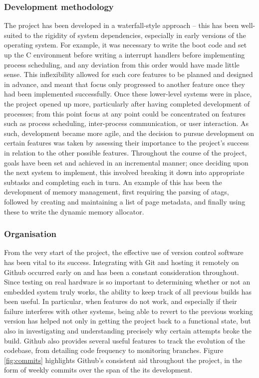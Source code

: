     \subsubsection{Development methodology}
        The project has been developed in a waterfall-style approach -- this has
        been well-suited to the rigidity of system dependencies, especially in
        early versions of the operating system. For example, it was necessary to
        write the boot code and set up the C environment before writing a
        interrupt handlers before implementing process scheduling, and any
        deviation from this order would have made little sense. This
        inflexibility allowed for such core features to be planned and designed
        in advance, and meant that focus only progressed to another feature once
        they had been implemented successfully. Once these lower-level systems
        were in place, the project opened up more, particularly after having
        completed development of processes; from this point focus at any point
        could be concentrated on features such as process scheduling,
        inter-process communication, or user interaction. As such, development
        became more agile, and the decision to pursue development on certain
        features was taken by assessing their importance to the project's
        success in relation to the other possible features. Throughout the
        course of the project, goals have been set and achieved in an
        incremental manner; once deciding upon the next system to implement,
        this involved breaking it down into appropriate subtasks and completing
        each in turn. An example of this has been the development of memory
        management, first requiring the parsing of atags, followed by creating
        and maintaining a list of page metadata, and finally using these to
        write the dynamic memory allocator.

    \subsubsection{Organisation}
        From the very start of the project, the effective use of version control
        software has been vital to its success. Integrating with Git and hosting
        it remotely on Github occurred early on and has been a constant
        consideration throughout. Since testing on real hardware is so important
        to determining whether or not an embedded system truly works, the
        ability to keep track of all previous builds has been useful.  In
        particular, when features do not work, and especially if their failure
        interferes with other systems, being able to revert to the previous
        working version has helped not only in getting the project back to a
        functional state, but also in investigating and understanding precisely
        why certain attempts broke the build. Github also provides several
        useful features to track the evolution of the codebase, from detailing
        code frequency to monitoring branches. Figure \ref{fig:commits}
        highlights Github's consistent aid throughout the project, in the form
        of weekly commits over the span of the its development.

